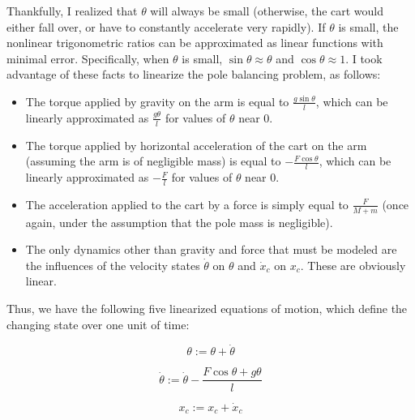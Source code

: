 \documentclass[11pt]{article}
\begin{document}
Thankfully, I realized that $\theta$ will always be small (otherwise, the cart would either fall over, or have to constantly accelerate very rapidly). If $\theta$ is small, the nonlinear trigonometric ratios can be approximated as linear functions with minimal error. Specifically, when $\theta$ is small, $\sin \theta \approx \theta$ and $\cos \theta \approx 1$. I took advantage of these facts to linearize the pole balancing problem, as follows:

\begin{itemize}
    \item The torque applied by gravity on the arm is equal to $\displaystyle \frac{\displaystyle g \sin \theta}{\displaystyle l}$, which can be linearly approximated as $\displaystyle \frac{\displaystyle g \theta}{\displaystyle l}$ for values of $\theta$ near 0.
    \item The torque applied by horizontal acceleration of the cart on the arm (assuming the arm is of negligible mass) is equal to $\displaystyle - \frac{\displaystyle F \cos \theta}{\displaystyle l}$, which can be linearly approximated as $\displaystyle - \frac{\displaystyle F}{\displaystyle l}$ for values of $\theta$ near 0.
    \item The acceleration applied to the cart by a force is simply equal to $\displaystyle \frac{\displaystyle F}{\displaystyle M + m}$ (once again, under the assumption that the pole mass is negligible).
    \item The only dynamics other than gravity and force that must be modeled are the influences of the velocity states $\dot \theta$ on $\theta$ and $\dot x _c$ on $x _c$. These are obviously linear.
\end{itemize}

Thus, we have the following five linearized equations of motion, which define the changing state over one unit of time:

\begin{equation}
    \displaystyle \theta := \theta + \dot \theta
\end{equation}

\begin{equation}
    \displaystyle \dot \theta := \dot \theta - \frac{\displaystyle F \cos \theta + g \theta}{\displaystyle l}
\end{equation}

\begin{equation}
    \displaystyle x _c := x _c + \dot x _c
\end{equation}
\end{document}
